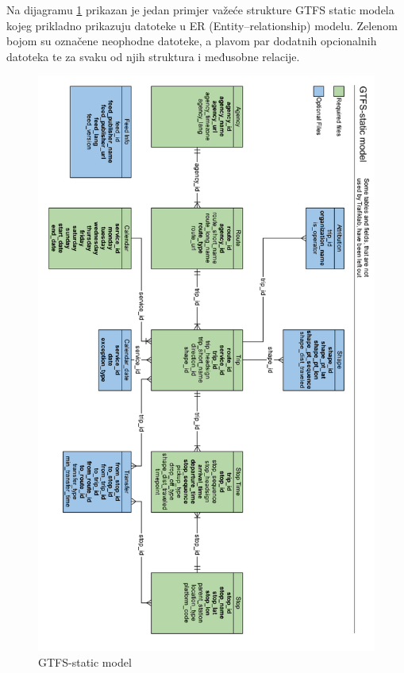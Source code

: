 \documentclass[zavrsnirad]{fer}
\begin{document}
Na dijagramu \ref{slk:gtfs-model} prikazan je jedan primjer važeće strukture GTFS static modela kojeg prikladno prikazuju datoteke u ER (Entity–relationship) modelu. Zelenom bojom su označene neophodne datoteke, a plavom par dodatnih opcionalnih datoteka te za svaku od njih struktura i međusobne relacije. 

\begin{figure}[H]
	\centering
	\includegraphics[width=\linewidth-30pt]{Figures/gtfs-model.png}
	\caption{GTFS-static model \cite{GTFS-schedule-model}}
	\label{slk:gtfs-model}
\end{figure}
\end{document}
